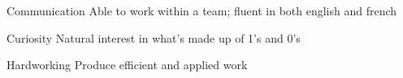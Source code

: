 

\begin{cvskills}

  \cvskill
    {Communication} %
    {Able to work within a team; fluent in both english and french}
    
  \cvskill
    {Curiosity} %
    {Natural interest in what's made up of 1's and 0's}
    
  \cvskill
    {Hardworking} %
    {Produce efficient and applied work}

\end{cvskills}
